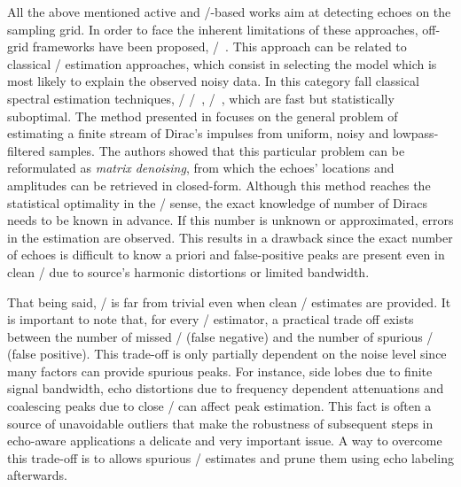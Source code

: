\mynewline
All the above mentioned active and \RIR/-based works aim at detecting echoes on the sampling grid.
In order to face the inherent limitations of these approaches, off-grid frameworks have been proposed, \eg/~.
This approach can be related to classical \MLdef/ estimation approaches, which consist in selecting the model which is most likely to explain the observed noisy data.
In this category fall classical spectral estimation techniques, \eg/ \MUSIC/~, \ESPRIT/~, which are fast but statistically suboptimal.
The method presented in  focuses on the general problem of estimating a finite stream of Dirac's impulses from uniform, noisy and lowpass-filtered samples.
The authors showed that this particular problem can be reformulated as \textit{matrix denoising}, from which the echoes' locations and amplitudes can be retrieved in closed-form.
Although this method reaches the statistical optimality in the \ML/ sense, the exact knowledge of number of Diracs needs to be known in advance.
If this number is unknown or approximated, errors in the estimation are observed.
This results in a drawback since the exact number of echoes is difficult to know a priori and false-positive peaks are present even in clean \RIRs/ due to source's harmonic distortions or limited bandwidth.

\mynewline
That being said, \AER/ is far from trivial even when clean \RIR/ estimates are provided.
It is important to note that, for every \TOA/ estimator, a practical trade off exists between the number of missed \TOAs/ (false negative) and the number of spurious \TOAs/ (false positive).
This trade-off is only partially dependent on the noise level since many factors can provide spurious peaks.
For instance, side lobes due to finite signal bandwidth, echo distortions due to frequency dependent attenuations and coalescing peaks due to close \TOAs/ can affect peak estimation.
This fact is often a source of unavoidable outliers that make the robustness of subsequent steps in echo-aware applications a delicate and very important issue.
A way to overcome this trade-off is to allows spurious \TOAs/ estimates and prune them using echo labeling afterwards.


